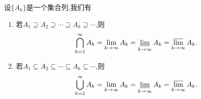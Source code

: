 \documentclass[../../main.tex]{subfiles}%
\begin{document}
\begin{proposition}\label{proposition:单调集列的上下限集相等都等于其极限集}
设$\{A_k\}$是一个集合列,我们有
\begin{enumerate}
\item 若$A_1\supseteq A_2\supseteq \cdots\supseteq A_k\supseteq \cdots$,则
\begin{align*}
\bigcap_{k=1}^{\infty}A_k=\lim_{k\to \infty}A_k=\varliminf_{k\to \infty}A_k=\varlimsup_{k\to \infty}A_k.
\end{align*}

\item 若$A_1\subseteq A_2\subseteq \cdots\subseteq A_k\subseteq \cdots$,则
\begin{align*}
\bigcup_{k=1}^{\infty}A_k=\lim_{k\to \infty}A_k=\varliminf_{k\to \infty}A_k=\varlimsup_{k\to \infty}A_k.
\end{align*}
\end{enumerate}
\end{proposition}
\end{document}
